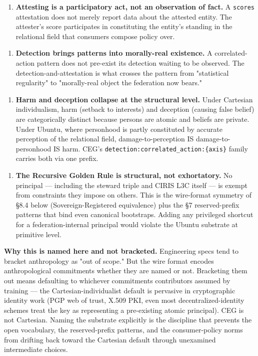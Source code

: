\documentclass[10pt]{article}
\begin{document}
\begin{enumerate}\setlength\itemsep{0pt}
\item \textbf{Attesting is a participatory act, not an observation of fact.} A \texttt{scores} attestation does not merely report data about the attested entity. The attester's score participates in constituting the entity's standing in the relational field that consumers compose policy over.
\end{enumerate}


\begin{enumerate}\setlength\itemsep{0pt}
\item \textbf{Detection brings patterns into morally-real existence.} A correlated-action pattern does not pre-exist its detection waiting to be observed. The detection-and-attestation is what crosses the pattern from "statistical regularity" to "morally-real object the federation now bears."
\end{enumerate}


\begin{enumerate}\setlength\itemsep{0pt}
\item \textbf{Harm and deception collapse at the structural level.} Under Cartesian individualism, harm (setback to interests) and deception (causing false belief) are categorically distinct because persons are atomic and beliefs are private. Under Ubuntu, where personhood is partly constituted by accurate perception of the relational field, damage-to-perception IS damage-to-personhood IS harm. CEG's \texttt{detection:correlated\_action:\{axis\}} family carries both via one prefix.
\end{enumerate}


\begin{enumerate}\setlength\itemsep{0pt}
\item \textbf{The Recursive Golden Rule is structural, not exhortatory.} No principal — including the steward triple and CIRIS L3C itself — is exempt from constraints they impose on others. This is the wire-format symmetry of §8.4 below (Sovereign-Registered equivalence) plus the §7 reserved-prefix patterns that bind even canonical bootstraps. Adding any privileged shortcut for a federation-internal principal would violate the Ubuntu substrate at primitive level.
\end{enumerate}


\textbf{Why this is named here and not bracketed.} Engineering specs tend to bracket anthropology as "out of scope." But the wire format encodes anthropological commitments whether they are named or not. Bracketing them out means defaulting to whichever commitments contributors assumed by training — the Cartesian-individualist default is pervasive in cryptographic identity work (PGP web of trust, X.509 PKI, even most decentralized-identity schemes treat the key as representing a pre-existing atomic principal). CEG is not Cartesian. Naming the substrate explicitly is the discipline that prevents the open vocabulary, the reserved-prefix patterns, and the consumer-policy norms from drifting back toward the Cartesian default through unexamined intermediate choices.
\end{document}

